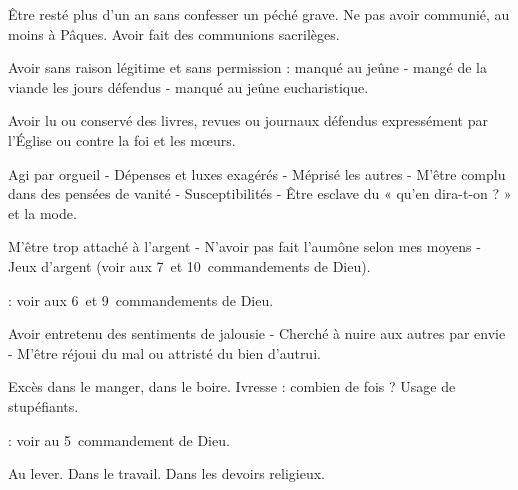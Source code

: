 Être resté plus d'un an sans confesser un péché grave. Ne pas avoir communié, au moins à Pâques. Avoir fait des communions sacrilèges.


Avoir sans raison légitime et sans permission : manqué au jeûne - mangé de la viande les jours défendus - manqué au
jeûne eucharistique.


Avoir lu ou conservé des livres, revues ou journaux défendus expressément par l’Église ou contre la foi et les mœurs.




Agi par orgueil - Dépenses et luxes exagérés - Méprisé les autres - M’être complu
dans des pensées de vanité - Susceptibilités - Être esclave du « qu’en dira-t-on ? »
et la mode.


M’être trop attaché à l’argent - N’avoir
pas fait l’aumône selon mes moyens - Jeux
d’argent (voir aux 7\ieme\ et 10\ieme\ commandements
de Dieu).

 : voir aux 6\ieme\ et 9\ieme\ commandements de Dieu.


Avoir entretenu des sentiments de jalousie - Cherché à nuire aux autres par envie
- M’être réjoui du mal ou attristé du bien
d’autrui.


Excès dans le manger, dans le boire.
Ivresse : combien de fois ? Usage de stupéfiants.

 : voir au 5\ieme\ commandement de Dieu.


Au lever. Dans le travail. Dans les devoirs religieux.
